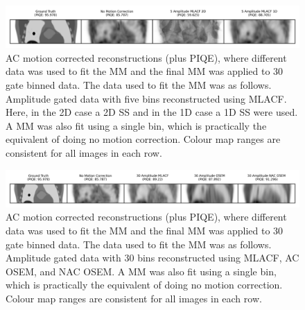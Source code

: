             \begin{figure}
                \centering
                
                \includegraphics[width=1.0\linewidth]{figures/motion_correction_2_results_2_1d_vs_2d_visual_analysis.png}
                
                \captionsetup{singlelinecheck=false}
                \caption{
                    \gls{AC} motion corrected reconstructions (plus \gls{PIQE}), where different data was used to fit the \gls{MM} and the final \gls{MM} was applied to $30$ gate binned data. The data used to fit the \gls{MM} was as follows. Amplitude gated data with five bins reconstructed using \gls{MLACF}. Here, in the \gls{2D} case a \gls{2D} \gls{SS} and in the \gls{1D} case a \gls{1D} \gls{SS} were used. A \gls{MM} was also fit using a single bin, which is practically the equivalent of doing no motion correction. Colour map ranges are consistent for all images in each row.
                }
                
                \label{fig:evaluation_of_pet_ct_motion_correction_incorporating_motion_models_using_mlacf_and_complex_gating_schemes_results_1d_vs_2d_visual_analysis}
            \end{figure}

            \begin{figure}
                \centering
                
                \includegraphics[width=1.0\linewidth]{figures/motion_correction_2_results_2_30_amplitude_visual_analysis.png}
                
                \captionsetup{singlelinecheck=false}
                \caption{
                    \gls{AC} motion corrected reconstructions (plus \gls{PIQE}), where different data was used to fit the \gls{MM} and the final \gls{MM} was applied to $30$ gate binned data. The data used to fit the \gls{MM} was as follows. Amplitude gated data with $30$ bins reconstructed using \gls{MLACF}, \gls{AC} \gls{OSEM}, and \gls{NAC} \gls{OSEM}. A \gls{MM} was also fit using a single bin, which is practically the equivalent of doing no motion correction. Colour map ranges are consistent for all images in each row.
                }
                
                \label{fig:evaluation_of_pet_ct_motion_correction_incorporating_motion_models_using_mlacf_and_complex_gating_schemes_results_30_amplitude_visual_analysis}
            \end{figure}

